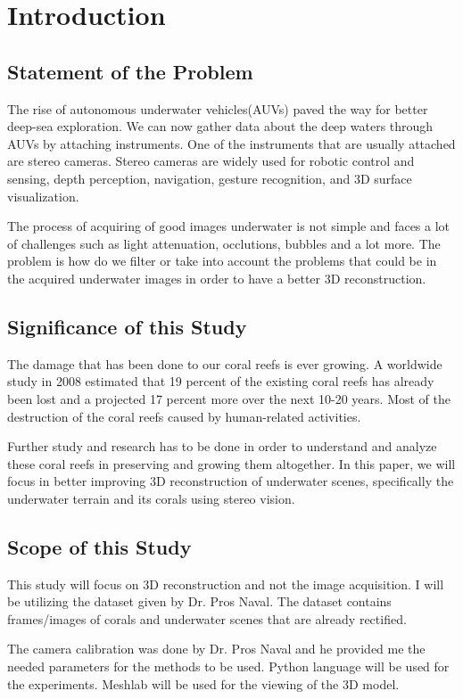\chapter{Introduction}

\section{Statement of the Problem}
    The rise of autonomous underwater vehicles(AUVs) paved the way for better deep-sea exploration.
 We can now gather data about the deep waters through AUVs by attaching instruments. One of the 
 instruments that are usually attached are stereo cameras. Stereo cameras are widely used for robotic 
 control and sensing, depth perception, navigation, gesture recognition, and 3D surface visualization.

The process of acquiring of good images underwater is not simple and faces a lot of challenges such
 as light attenuation, occlutions, bubbles and a lot more. The problem is how do we filter or take into account the problems that could
  be in the acquired underwater images in order to have a better 3D reconstruction.





\section{Significance of this Study}
  The damage that has been done to our coral reefs is ever growing. A 
worldwide study in 2008 estimated that 19 percent of the existing coral reefs has already 
been lost and a projected 17 percent more over the next 10-20 years. Most of the destruction
 of the coral reefs caused by human-related activities. 

    Further study and research has to be done in order to understand and analyze
these coral reefs in preserving and growing them altogether. In this paper, we will focus in better improving 3D reconstruction of underwater scenes, specifically the underwater terrain and its corals using stereo vision.




\section{Scope of this Study}
    This study will focus on 3D reconstruction and not the image acquisition. I will be 
utilizing the dataset given by Dr. Pros Naval. The dataset contains frames/images of
corals and underwater scenes that are already rectified. 

    The camera calibration was done by Dr. Pros Naval and he provided me the needed
parameters for the methods to be used. Python language will be used for the experiments.
 Meshlab will be used for the viewing of the 3D model.

